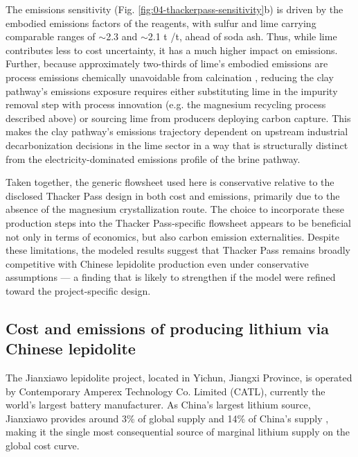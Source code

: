 \documentclass{article}
\renewcommand\_{\textunderscore\allowbreak}
\begin{document}
The emissions sensitivity (Fig. \ref{fig:04-thackerpass-sensitivity}b) is driven by the embodied emissions factors of the reagents, with sulfur and lime carrying comparable ranges of $\sim$2.3 and $\sim$2.1 t /t, ahead of soda ash. Thus, while lime contributes less to cost uncertainty, it has a much higher impact on emissions. Further, because approximately two-thirds of lime's embodied emissions are process emissions chemically unavoidable from calcination \cite{lavegliaDecarbonizingLimebasedConstruction2023}, reducing the clay pathway's emissions exposure requires either substituting lime in the impurity removal step with process innovation (e.g. the magnesium recycling process described above) or sourcing lime from producers deploying carbon capture. This makes the clay pathway's emissions trajectory dependent on upstream industrial decarbonization decisions in the lime sector in a way that is structurally distinct from the electricity-dominated emissions profile of the brine pathway. 

Taken together, the generic flowsheet used here is conservative relative to the disclosed Thacker Pass design in both cost and emissions, primarily due to the absence of the magnesium crystallization route. The choice to incorporate these production steps into the Thacker Pass-specific flowsheet appears to be beneficial not only in terms of economics, but also carbon emission externalities. Despite these limitations, the modeled results suggest that Thacker Pass remains broadly competitive with Chinese lepidolite production even under conservative assumptions --- a finding that is likely to strengthen if the model were refined toward the project-specific design.

\subsection{Cost and emissions of producing lithium via Chinese lepidolite}\label{sec:04-jianxiawo}

The Jianxiawo lepidolite project, located in Yichun, Jiangxi Province, is operated by Contemporary Amperex Technology Co. Limited (CATL), currently the world's largest battery manufacturer. As China's largest lithium source, Jianxiawo provides around 3\% of global supply and 14\% of China's supply \cite{liChinasCATLSuspends2025, andrezejewskiResourcesEnergyQuarterly2025, usgeologicalsurveyMineralCommoditySummaries2026}, making it the single most consequential source of marginal lithium supply on the global cost curve.
\end{document}
